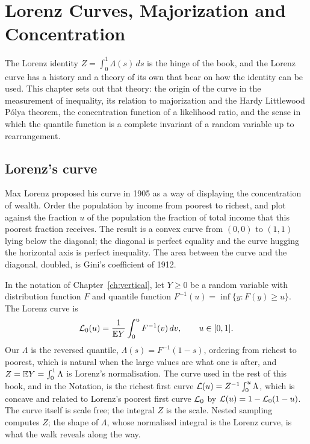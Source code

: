 \chapter{Lorenz Curves, Majorization and Concentration}
\label{ch:lorenz}

The Lorenz identity $Z = \int_0^1 \Lambda(s) \, ds$ is the hinge of the book, and the Lorenz curve has a history and a theory of its own that bear on how the identity can be used. This chapter sets out that theory: the origin of the curve in the measurement of inequality, its relation to majorization and the Hardy Littlewood P\'olya theorem, the concentration function of a likelihood ratio, and the sense in which the quantile function is a complete invariant of a random variable up to rearrangement.

\section{Lorenz's curve}

Max Lorenz proposed his curve in 1905 as a way of displaying the concentration of wealth. Order the population by income from poorest to richest, and plot against the fraction $u$ of the population the fraction of total income that this poorest fraction receives. The result is a convex curve from $(0,0)$ to $(1,1)$ lying below the diagonal; the diagonal is perfect equality and the curve hugging the horizontal axis is perfect inequality. The area between the curve and the diagonal, doubled, is Gini's coefficient of 1912.

In the notation of Chapter~\ref{ch:vertical}, let $Y \ge 0$ be a random variable with distribution function $F$ and quantile function $F^{-1}(u) = \inf\{ y : F(y) \ge u \}$. The Lorenz curve is
\[
\mathcal{L}_0(u) = \frac{1}{\mathbb{E} Y} \int_0^u F^{-1}(v) \, dv , \qquad u \in [0, 1] .
\]
Our $\Lambda$ is the reversed quantile, $\Lambda(s) = F^{-1}(1 - s)$, ordering from richest to poorest, which is natural when the large values are what one is after, and $Z = \mathbb{E} Y = \int_0^1 \Lambda$ is Lorenz's normalisation. The curve used in the rest of this book, and in the Notation, is the richest first curve $\mathcal{L}(u) = Z^{-1} \int_0^u \Lambda$, which is concave and related to Lorenz's poorest first curve $\mathcal{L}_0$ by $\mathcal{L}(u) = 1 - \mathcal{L}_0(1 - u)$. The curve itself is scale free; the integral $Z$ is the scale. Nested sampling computes $Z$; the shape of $\Lambda$, whose normalised integral is the Lorenz curve, is what the walk reveals along the way.

